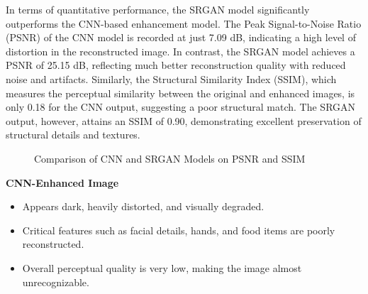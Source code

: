 In terms of quantitative performance, the SRGAN model significantly outperforms the CNN-based enhancement model. The Peak Signal-to-Noise Ratio (PSNR) of the CNN model is recorded at just 7.09 dB, indicating a high level of distortion in the reconstructed image. In contrast, the SRGAN model achieves a PSNR of 25.15 dB, reflecting much better reconstruction quality with reduced noise and artifacts. Similarly, the Structural Similarity Index (SSIM), which measures the perceptual similarity between the original and enhanced images, is only 0.18 for the CNN output, suggesting a poor structural match. The SRGAN output, however, attains an SSIM of 0.90, demonstrating excellent preservation of structural details and textures. 




\begin{figure}[h!]
    \centering
    \caption{Comparison of CNN and SRGAN Models on PSNR and SSIM}
    \label{fig:cnn_vs_srgan_chart}
\end{figure}


\textbf{CNN-Enhanced Image}
\begin{itemize}
    \item Appears dark, heavily distorted, and visually degraded.
    
    \item Critical features such as facial details, hands, and food items are poorly reconstructed.
    
    \item Overall perceptual quality is very low, making the image almost unrecognizable.
\end{itemize}

